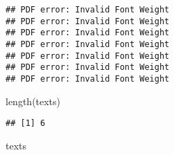 \documentclass[
]{book}
\newenvironment{Shaded}{\begin{snugshade}}{\end{snugshade}}
\newcommand{\FunctionTok}[1]{\textcolor[rgb]{0.00,0.00,0.00}{#1}}
\newcommand{\NormalTok}[1]{#1}
\begin{document}
\begin{verbatim}
## PDF error: Invalid Font Weight
## PDF error: Invalid Font Weight
## PDF error: Invalid Font Weight
## PDF error: Invalid Font Weight
## PDF error: Invalid Font Weight
## PDF error: Invalid Font Weight
## PDF error: Invalid Font Weight
\end{verbatim}

\begin{Shaded}
\begin{Highlighting}[]
\FunctionTok{length}\NormalTok{(texts)}
\end{Highlighting}
\end{Shaded}

\begin{verbatim}
## [1] 6
\end{verbatim}

\begin{Shaded}
\begin{Highlighting}[]
\NormalTok{texts}
\end{Highlighting}
\end{Shaded}
\end{document}
